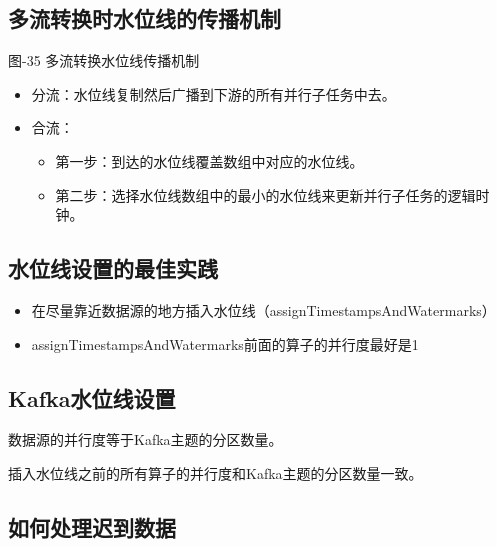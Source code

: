 \hypertarget{ux591aux6d41ux8f6cux6362ux65f6ux6c34ux4f4dux7ebfux7684ux4f20ux64adux673aux5236}{%
\subsection{多流转换时水位线的传播机制}\label{ux591aux6d41ux8f6cux6362ux65f6ux6c34ux4f4dux7ebfux7684ux4f20ux64adux673aux5236}}

图-35 多流转换水位线传播机制

\begin{itemize}
\tightlist
\item
  分流：水位线复制然后广播到下游的所有并行子任务中去。
\item
  合流：

  \begin{itemize}
  \tightlist
  \item
    第一步：到达的水位线覆盖数组中对应的水位线。
  \item
    第二步：选择水位线数组中的最小的水位线来更新并行子任务的逻辑时钟。
  \end{itemize}
\end{itemize}

\hypertarget{ux6c34ux4f4dux7ebfux8bbeux7f6eux7684ux6700ux4f73ux5b9eux8df5}{%
\subsection{水位线设置的最佳实践}\label{ux6c34ux4f4dux7ebfux8bbeux7f6eux7684ux6700ux4f73ux5b9eux8df5}}

\begin{itemize}
\tightlist
\item
  在尽量靠近数据源的地方插入水位线（assignTimestampsAndWatermarks）
\item
  assignTimestampsAndWatermarks前面的算子的并行度最好是1
\end{itemize}

\hypertarget{kafkaux6c34ux4f4dux7ebfux8bbeux7f6e}{%
\subsection{Kafka水位线设置}\label{kafkaux6c34ux4f4dux7ebfux8bbeux7f6e}}

数据源的并行度等于Kafka主题的分区数量。

插入水位线之前的所有算子的并行度和Kafka主题的分区数量一致。

\hypertarget{ux5982ux4f55ux5904ux7406ux8fdfux5230ux6570ux636e}{%
\subsection{如何处理迟到数据}\label{ux5982ux4f55ux5904ux7406ux8fdfux5230ux6570ux636e}}

